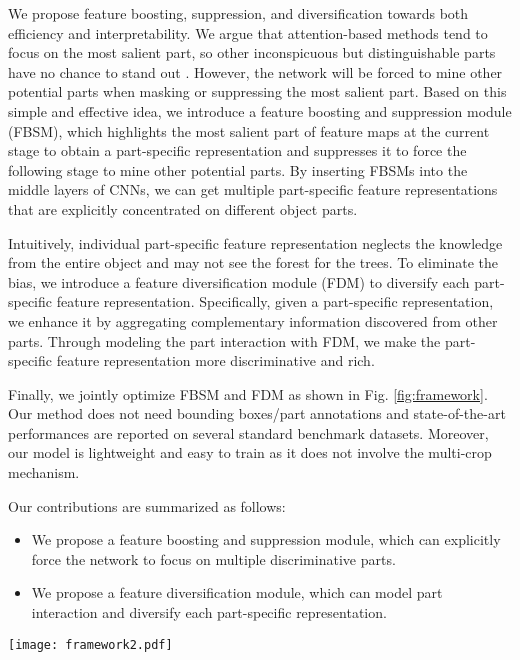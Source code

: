 \documentclass[conference]{IEEEtran}
\begin{document}
	We propose feature boosting, suppression, and diversification towards both efficiency and interpretability. We argue that attention-based methods tend to focus on the most salient part, so other inconspicuous but distinguishable parts have no chance to stand out \cite{GA-CNN}. However, the network will be forced to mine other potential parts when masking or suppressing the most salient part.
	Based on this simple and effective idea, we
	introduce a feature boosting and suppression module (FBSM), which highlights the most salient part of feature maps at the current stage to obtain a part-specific representation and suppresses it to force the following stage to mine other potential parts.
	By inserting FBSMs into the middle layers of CNNs, we can get multiple part-specific feature representations that are explicitly concentrated on different object parts.
	
	Intuitively, individual part-specific feature representation neglects
	the knowledge from the entire object and may not see the forest for the trees. To eliminate the bias, we introduce a feature diversification module (FDM) to diversify each part-specific feature representation. Specifically, given a part-specific representation, we enhance it by aggregating complementary information discovered from other parts. Through modeling the part interaction with FDM, we make the part-specific feature representation more discriminative and rich. 
	
	Finally, we jointly optimize FBSM and FDM as shown in Fig. \ref{fig:framework}.
	Our method does not need bounding boxes/part annotations and state-of-the-art performances are reported on several standard benchmark datasets. Moreover, our model is lightweight and easy to train as it does not involve the multi-crop mechanism\cite{RA-CNN}\cite{DB-Net}\cite{FDL}.
	
	Our contributions are summarized as follows:
	\begin{itemize}
		\item We propose a feature boosting and suppression module, which can explicitly force the network to focus on multiple discriminative parts.
		\item We propose a feature diversification module, which can model part interaction and diversify each part-specific representation.
	\end{itemize}
	\begin{figure*}
		\centering
		\texttt{[image: framework2.pdf]}
		\caption{The overview of our method.}
		\label{fig:framework}
	\end{figure*}
\end{document}
